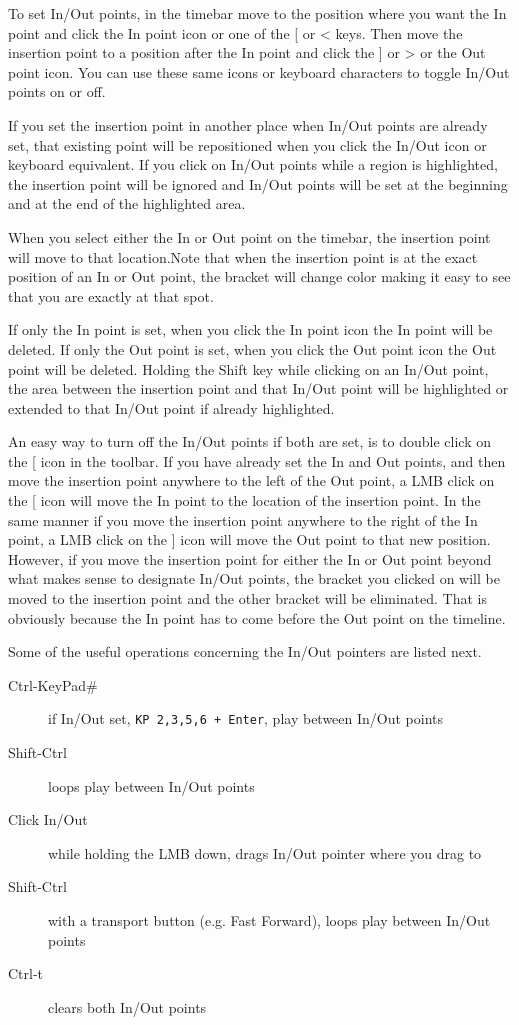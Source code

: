 To set In/Out points, in the timebar move to the position where you want the In point and click the In
point icon or one of the [ or < keys.
Then move the insertion point to a position after the In point and click the ] or > or the Out point icon. 
You can use these same icons or keyboard characters to toggle In/Out points on or off.

If you set the insertion point in another place when In/Out points are already set, that existing point will be
repositioned when you click the In/Out icon or keyboard equivalent. 
If you click on In/Out points while a region is highlighted, the insertion point will be ignored and In/Out points will be set at the beginning and at the end of the highlighted area.

When you select either the In or Out point on the timebar, the insertion point will move to that location.Note that when the insertion point is at the exact position of an In or Out point, the bracket will change
color making it easy to see that you are exactly at that spot.
 
If only the In point is set, when you click the In point icon the In point will be deleted. 
If only the Out point is set, when you click the Out point icon the Out point will be deleted. 
Holding the Shift key while clicking on an In/Out point, the area between the insertion point and that
In/Out point will be highlighted or extended to that In/Out point if already highlighted. 

An easy way to turn off the In/Out points if both are set, is to double click on the [ icon in the toolbar. 
If you have already set the In and Out points, and then move the insertion point anywhere to the left of
the Out point, a LMB click on the [ icon will move the In point to the location of the insertion point.  In the same
manner if you move the insertion point anywhere to the right of the In point, a LMB click on the ] icon
will move the Out point to that new position.  However, if you move the insertion point for either the
In or Out point beyond what makes sense to designate In/Out points, the bracket you clicked on will be
moved to the insertion point and the other bracket will be eliminated.  That is obviously because the
In point has to come before the Out point on the timeline.

Some of the useful operations concerning the In/Out pointers are listed next.

\begin{description}
    \item[Ctrl-KeyPad\#]  if In/Out set, \texttt{KP 2,3,5,6 + Enter}, play between In/Out points
    \item[Shift-Ctrl]  loops play between In/Out points
    \item[Click In/Out] while holding the LMB down, drags In/Out pointer where you drag to
    \item[Shift-Ctrl] with a transport button (e.g. Fast Forward), loops play between In/Out points
    \item[Ctrl-t]  clears both In/Out points
\end{description}

